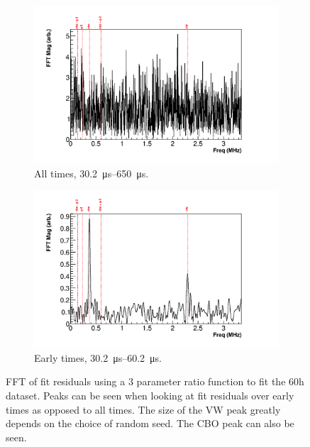 \documentclass[12pt,letterpaper]{article}
\begin{document}
\begin{figure}[]
\centering
\hspace*{-1.5cm}  
    \begin{subfigure}[t]{0.6\textwidth}
        \centering
        \includegraphics[width=\textwidth]{FFT_3param_allTimes} %
        \caption{All times, \SIrange{30.2}{650}{\micro s}.}
    \end{subfigure}%
    \begin{subfigure}[t]{0.6\textwidth}
        \centering
        \includegraphics[width=\textwidth]{FFT_3param_earlyTimes} %
        \caption{Early times, \SIrange{30.2}{60.2}{\micro s}.}
    \end{subfigure}
\caption[]{FFT of fit residuals using a 3 parameter ratio function to fit the 60h dataset. Peaks can be seen when looking at fit residuals over early times as opposed to all times. The size of the VW peak greatly depends on the choice of random seed. The CBO peak can also be seen.}
\label{fig:FFT_3param}
\end{figure}
\end{document}
